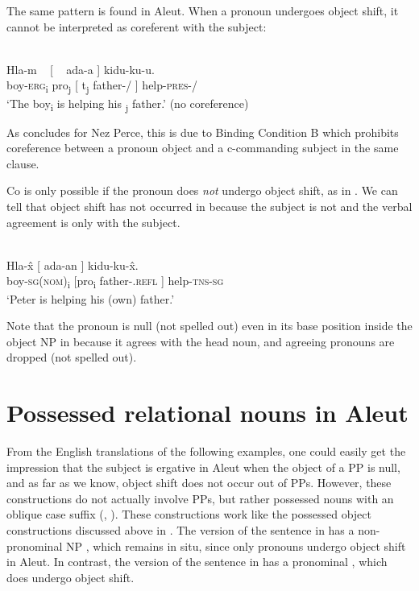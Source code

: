\documentclass[output=paper]{LSP/langsci}
\begin{document}
The same pattern is found in Aleut. When a pronoun  undergoes object shift, it cannot be interpreted as coreferent with the subject:

\ea\label{ex:woolford:42}
\\
\gll Hla-m                               ~                     [ ~ ada-a                                                       ]  kidu-ku-u.            \\
     boy-\textsc{erg}\textsubscript{i}    pro\textsubscript{j}  [  t\textsubscript{j}  father-/ ]  help-\textsc{pres}-/   \\
\glt ‘The boy\textsubscript{i} is helping his\textsubscript{ j}  father.’  (no coreference)
\z

As \citet{Deal2013} concludes for Nez Perce, this is due to Binding Condition B which prohibits coreference between a pronoun object and a c-commanding subject in the same clause.

Co is only possible if the pronoun  does \textit{not} undergo object shift, as in . We can tell that object shift has not occurred in  because the subject is not  and the verbal agreement is only with the subject.


\ea\label{ex:woolford:43}
\\
\gll Hla-\^{x}     [  ada-an ]    kidu-ku-\^{x}.                                           \\
     boy-\textsc{sg}(\textsc{nom})\textsubscript{i}  [pro\textsubscript{i}  father-.\textsc{refl} ]    help-\textsc{tns}-\textsc{sg}   \\
\glt ‘Peter is helping his (own) father.’
\z

Note that the pronoun  is null (not spelled out) even in its base position inside the object NP in  because it agrees with the head noun, and agreeing pronouns are dropped (not spelled out).

\section{Possessed relational nouns in Aleut}\label{sec:woolford:4}

From the English translations of the following examples, one could easily get the impression that the subject is ergative in Aleut when the object of a PP is null, and as far as we know, object shift does not occur out of PPs. However, these constructions do not actually involve PPs, but rather possessed  nouns with an oblique case suffix (\citealt{fortescue1985anaphoric}, \citealt[47]{bergsland1997aleut}). These constructions work like the possessed object constructions discussed above in . The version of the sentence in  has a non-pronominal NP , which remains in situ, since only pronouns undergo object shift in Aleut. In contrast, the version of the sentence in  has a pronominal , which does undergo object shift. 
\end{document}

